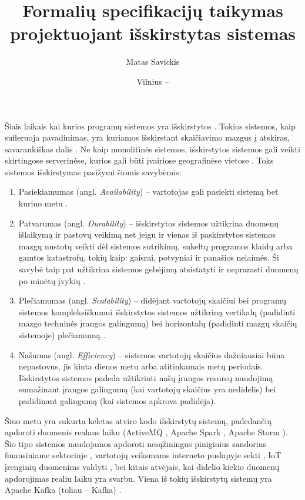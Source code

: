 \documentclass{VUMIFPSmagistrinis}
\title{Formalių specifikacijų taikymas projektuojant išskirstytas sistemas}
\author{Matas Savickis}
\date{Vilnius – \the\year}
\begin{document}

\maketitle
\setcounter{page}{2}
\tableofcontents




		Šiais laikais kai kurios programų sistemos yra išskirstytos \cite{mcr}. 
		Tokios sistemos, kaip sufleruoja pavadinimas, yra kuriamos išskirstant skaičiavimo mazgus į atskiras, savarankiškas dalis \cite{coulouris2005distributed}.
		Ne kaip monolitinės sistemos, išskirstytos sistemos gali veikti skirtingose serverinėse, kurios gali būti įvairiose geografinėse vietose \cite{shirriff2006method}.
		Toks sistemos išskirstymas pasižymi šiomis savybėmis:
		\begin{enumerate}
			\item{Pasiekiamumas (angl. {\it Availability}) -- vartotojas gali pasiekti sistemą bet kuriuo metu \cite{180327}.}
			\item{Patvarumas (angl. {\it Durability}) -- išskirstytos sistemos užtikrina duomenų išlaikymą ir pastovų veikimą net jeigu ir vienas iš paskirstytos sistemos mazgų nustotų veikti dėl sistemos sutrikimų, sukeltų programos klaidų arba gamtos katastrofų, tokių kaip: gaisrai, potvyniai ir panašios nelaimės. Ši savybė taip pat užtikrina sistemos gebėjimą atsistatyti ir neprarasti duomenų po minėtų įvykių \cite{5470366}.}
			\item{Plečiamumas (angl. {\it Scalability}) -- didėjant vartotojų skaičiui bei programų sistemos kompleksiškumui išskirstytos sistemos užtikriną vertikalų (padidinti mazgo techninės įrangos galingumą) bei horizontalų (padidinti mazgų skaičių sistemoje) plečiamumą \cite{862209}.}
			\item{Našumas (angl. {\it Efficiency}) -- sistemos vartotojų skaičius dažniausiai būna nepastovus, jis kinta dienos metu arba atitinkamais metų periodais. Išskirstytos sistemos padeda užtikrinti našų įrangos resursų naudojimą sumažinant įrangos galingumą (kai vartotojų skaičius yra nedidelis) bei padidinant galingumą (kai sistemos apkrova padidėja).}
		\end{enumerate}
		Šiuo metu yra sukurta keletas atviro kodo išskirstytų sistemų, padedančių apdoroti duomenis realaus laiku (ActiveMQ \cite{snyder2011activemq}, Apache Spark \cite{spark2018apache}, Apache Storm \cite{iqbal2015big}).	
		Šio tipo sistemos naudojamos apdoroti nesąžiningus piniginius sandorius finansiniame sektoriuje \cite{fraud}, vartotojų veiksmams interneto puslapyje sekti \cite{tracking}, IoT įrenginių duomenims valdyti \cite{iot}, bei kitais atvėjais, kai didelio kiekio duomenų apdorojimas realiu laiku yra svarbu. 
		Viena iš tokių išskirstytų sistemų yra Apache Kafka (toliau -- Kafka) \cite{kfk}.
\end{document}
